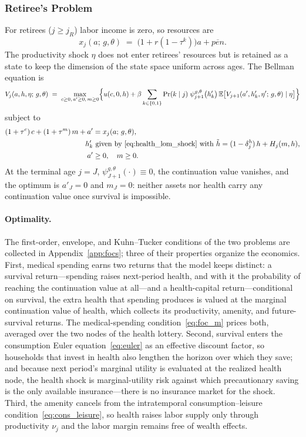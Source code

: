 \documentclass[12pt,a4paper]{article}
\newcommand{\E}{\mathbb{E}}
\begin{document}
\subsubsection{Retiree's Problem}
\label{subsubsec:retiree}
For retirees ($j \geq j_R$) labor income is zero, so resources are
\begin{equation}
\label{eq:resources_retiree}
x_j(a;\, g, \theta) \;=\; \bigl(1 + r(1-\tau^k)\bigr) a + \overline{pen}.
\end{equation}
The productivity shock $\eta$ does not enter retirees' resources but is retained as a state to keep the dimension of the state space uniform across ages. The Bellman equation is
\begin{equation}
\label{eq:retiree_bellman}
V_j(a, h, \eta;\, g, \theta)
\;=\;
\max_{c \geq 0,\, a' \geq 0,\, m \geq 0}
\Bigl\{
u(c, 0, h)
+ \beta \sum_{k \in \{0,1\}} \Pr(k \mid j)\;
\psi_{j+1}^{g,\theta}\bigl(h'_k\bigr)\,
\E\bigl[V_{j+1}(a', h'_k, \eta';\, g, \theta) \mid \eta\bigr]
\Bigr\}
\end{equation}
subject to
\begin{align}
(1 + \tau^c)\, c + (1 + \tau^m)\, m + a' &= x_j(a;\, g, \theta), \label{eq:retiree_budget}\\
h'_k &\ \text{given by~\eqref{eq:health_lom_shock} with } \tilde h = (1 - \delta_j^h)\, h + H_j(m, h), \label{eq:retiree_health}\\
a' &\geq 0,\quad m \geq 0. \label{eq:retiree_borrow}
\end{align}
At the terminal age $j = J$, $\psi_{J+1}^{g,\theta}(\cdot) \equiv 0$, the continuation value vanishes, and the optimum is $a'_J = 0$ and $m_J = 0$: neither assets nor health carry any continuation value once survival is impossible.

\paragraph{Optimality.}
The first-order, envelope, and Kuhn--Tucker conditions of the two problems are collected in Appendix~\ref{app:focs}; three of their properties organize the economics. First, medical spending earns two returns that the model keeps distinct: a survival return---spending raises next-period health, and with it the probability of reaching the continuation value at all---and a health-capital return---conditional on survival, the extra health that spending produces is valued at the marginal continuation value of health, which collects its productivity, amenity, and future-survival returns. The medical-spending condition~\eqref{eq:foc_m} prices both, averaged over the two nodes of the health lottery. Second, survival enters the consumption Euler equation~\eqref{eq:euler} as an effective discount factor, so households that invest in health also lengthen the horizon over which they save; and because next period's marginal utility is evaluated at the realized health node, the health shock is marginal-utility risk against which precautionary saving is the only available insurance---there is no insurance market for the shock. Third, the amenity cancels from the intratemporal consumption--leisure condition~\eqref{eq:cons_leisure}, so health raises labor supply only through productivity $\nu_j$ and the labor margin remains free of wealth effects.
\end{document}

